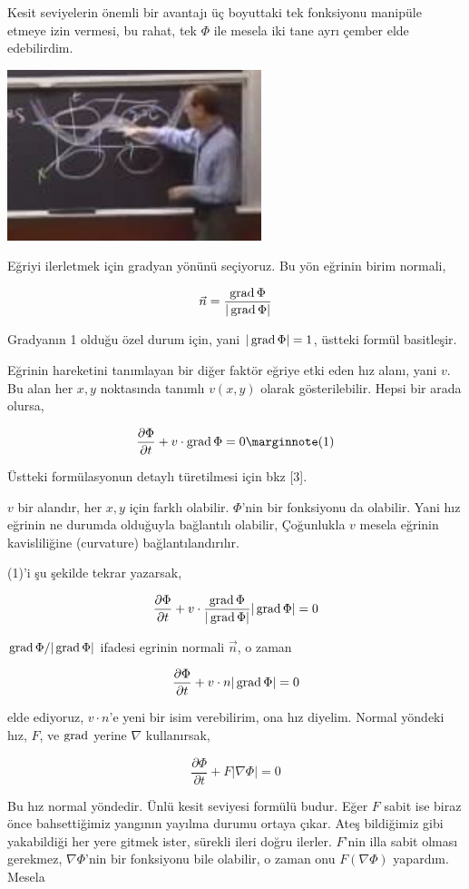 \documentclass[12pt,fleqn]{article}\usepackage{../../common}
\begin{document}
Kesit seviyelerin önemli bir avantajı üç boyuttaki tek fonksiyonu manipüle
etmeye izin vermesi, bu rahat, tek $\Phi$ ile mesela iki tane ayrı çember elde
edebilirdim.

\includegraphics[width=20em]{2_11_05.jpg}

Eğriyi ilerletmek için gradyan yönünü seçiyoruz. Bu yön eğrinin birim normali,

$$
\vec{n} = \frac{\operatorname{grad} \Phi}{|\operatorname{grad} \Phi|}
$$

Gradyanın 1 olduğu özel durum için, yani $|\operatorname{grad} \Phi| = 1$, üstteki formül
basitleşir.

Eğrinin hareketini tanımlayan bir diğer faktör eğriye etki eden hız alanı, yani
$v$. Bu alan her $x,y$ noktasında tanımlı $v(x,y)$ olarak gösterilebilir. Hepsi
bir arada olursa,

$$
\frac{\partial \Phi}{\partial t} + v \cdot \grad \Phi = 0 
\mlabel{1}
$$

Üstteki formülasyonun detaylı türetilmesi için bkz [3].

$v$ bir alandır, her $x,y$ için farklı olabilir. $\Phi$'nin bir fonksiyonu da
olabilir. Yani hız eğrinin ne durumda olduğuyla bağlantılı olabilir, Çoğunlukla
$v$ mesela eğrinin kavisliliğine (curvature) bağlantılandırılır.

(1)'i şu şekilde tekrar yazarsak,

$$
\frac{\partial \Phi}{\partial t} + v \cdot
\frac{\operatorname{grad} \Phi}{|\operatorname{grad} \Phi|} |\operatorname{grad} \Phi| = 0 
$$

$\operatorname{grad} \Phi/|\operatorname{grad} \Phi|$ ifadesi egrinin normali $\vec{n}$, o zaman 

$$
\frac{\partial \Phi}{\partial t} + v \cdot n |\operatorname{grad} \Phi| = 0 
$$

elde ediyoruz, $v \cdot n$'e yeni bir isim verebilirim, ona hız diyelim. Normal
yöndeki hız, $F$, ve $\operatorname{grad}$ yerine $\nabla$ kullanırsak,

$$
\frac{\partial \Phi}{\partial t} + F |\nabla \Phi| = 0 
$$

Bu hız normal yöndedir. Ünlü kesit seviyesi formülü budur. Eğer $F$ sabit ise
biraz önce bahsettiğimiz yangının yayılma durumu ortaya çıkar. Ateş bildiğimiz
gibi yakabildiği her yere gitmek ister, sürekli ileri doğru ilerler. $F$'nin
illa sabit olması gerekmez, $\nabla \Phi$'nin bir fonksiyonu bile olabilir, o
zaman onu $F(\nabla \Phi)$ yapardım. Mesela
\end{document}

